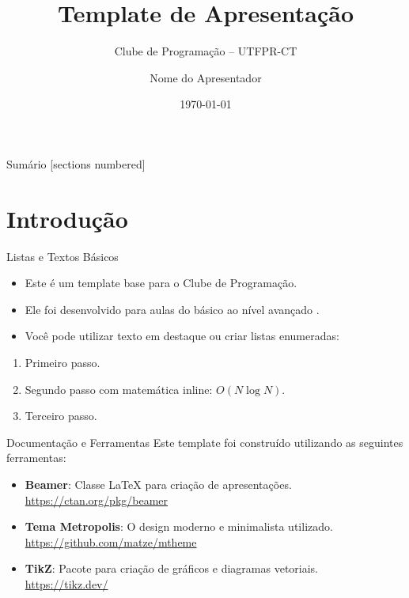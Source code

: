 \documentclass[utf8, aspectratio=169]{beamer}
\title{Template de Apresentação}
\subtitle{Clube de Programação -- UTFPR-CT}
\author{Nome do Apresentador}
\institute{Universidade Tecnológica Federal do Paraná, Campus Curitiba}
\date{\today}
\begin{document}
\begin{frame}
  \titlepage
\end{frame}

\begin{frame}{Sumário}
  [sections numbered]
  \tableofcontents[hideallsubsections]
\end{frame}

\section{Introdução}

\begin{frame}{Listas e Textos Básicos}
  \begin{itemize}
    \item Este é um template base para o \alert{Clube de Programação}.
    \item Ele foi desenvolvido para aulas do básico ao nível avançado \parencite{halim2013competitive}.
    \item Você pode utilizar \alert{texto em destaque} ou criar listas enumeradas:
  \end{itemize}
  
  \begin{enumerate}
    \item Primeiro passo.
    \item Segundo passo com matemática inline: $O(N \log N)$.
    \item Terceiro passo.
  \end{enumerate}
\end{frame}

\begin{frame}{Documentação e Ferramentas}
  Este template foi construído utilizando as seguintes ferramentas:
  \vspace{0.5cm}
  \begin{itemize}
    \item \textbf{Beamer}: Classe LaTeX para criação de apresentações. \\
          \url{https://ctan.org/pkg/beamer}
    \vspace{0.3cm}
    \item \textbf{Tema Metropolis}: O design moderno e minimalista utilizado. \\
          \url{https://github.com/matze/mtheme}
    \vspace{0.3cm}
    \item \textbf{TikZ}: Pacote para criação de gráficos e diagramas vetoriais. \\
          \url{https://tikz.dev/}
  \end{itemize}
\end{frame}
\end{document}
